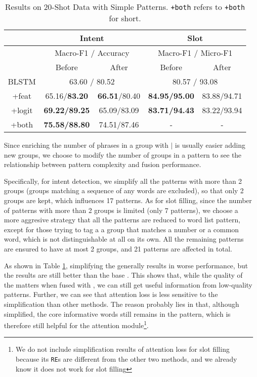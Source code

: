 \begin{table}
\setlength{\tabcolsep}{0.23em}
\centering
\small{
\begin{tabular}{|c|c|c|c|c|}

\hline
  & \multicolumn{2}{|c|}{Intent} & \multicolumn{2}{|c|}{Slot}  \\
\hline
  & \multicolumn{2}{|c|}{Macro-F1 / Accuracy} & \multicolumn{2}{|c|}{Macro-F1 / Micro-F1}  \\
\hline
  & Before & After & Before & After \\
\hline
BLSTM & \multicolumn{2}{|c|}{63.60 / 80.52} & \multicolumn{2}{|c|}{80.57 / 93.08}  \\
\hline
+feat & 65.16/\textbf{83.20} & \textbf{66.51}/80.40 & \textbf{84.95/95.00} & 83.88/94.71 \\
\hline
+logit & \textbf{69.22/89.25} & 65.09/83.09 & \textbf{83.71/94.43} & 83.22/93.94  \\
\hline
+both & \textbf{75.58/88.80} & 74.51/87.46 & - & - \\
\hline 
\end{tabular}
}
\caption{Results on 20-Shot Data with Simple Patterns. \texttt{+both} refers to \ptatt\texttt{+both} for short.}
\label{tab_simple}
\end{table}

Since enriching the number of phrases in a group with $|$ is usually easier adding new groups, we choose to modify the number of groups in a pattern to see the relationship between pattern complexity and fusion performance.

Specifically, for intent detection, we simplify all the patterns with more than 2 groups (groups matching a sequence of any words are excluded), so that only 2 groups are kept, which influences 17 patterns. 
As for slot filling, since the number of patterns with more than 2 groups is limited (only 7 patterns), we choose a more aggresive strategy that all the patterns are reduced to word list pattern, except for those trying to tag a a group that matches a number or a common word, which is not distinguishable at all on its own. 
All the remaining patterns are ensured to have at most 2 groups, and 21 patterns are affected in total.

As shown in Table \ref{tab_simple}, simplifying the \RE generally results in worse performance, but the results are still better than the base \BLSTM. 
This shows that, while the quality of the \RE matters when fused with \NN, we can still get useful information from low-quality patterns. Further, we can see that attention loss is less sensitive to the simplification than other methods. 
The reason probably lies in that, although simplified, the core informative words still remains in the pattern, which is therefore still helpful for the attention module\footnote{
We do not include simplification results of attention loss for slot filling because its \texttt{RE}s are different from the other two methods, and we already know it does not work for slot filling}.







